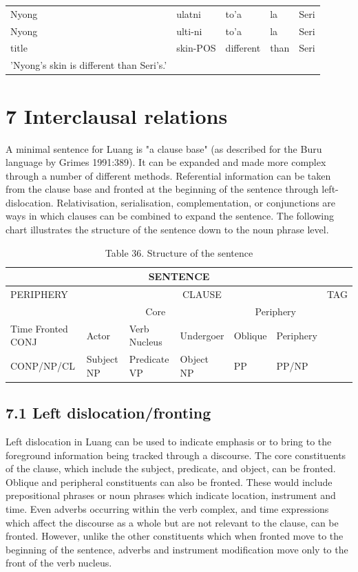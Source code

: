 \documentclass[10pt]{article}
\begin{document}
\begin{center}
\begin{tabular}{lllll}
Nyong & ulatni & to'a & la & Seri \\
Nyong & ulti-ni & to'a & la & Seri \\
title & skin-POS & different & than & Seri \\
'Nyong's skin is different than Seri's.' &  &  &  &  \\
\end{tabular}
\end{center}

\section*{7 Interclausal relations}
A minimal sentence for Luang is "a clause base" (as described for the Buru language by Grimes 1991:389). It can be expanded and made more complex through a number of different methods. Referential information can be taken from the clause base and fronted at the beginning of the sentence through left-dislocation. Relativisation, serialisation, complementation, or conjunctions are ways in which clauses can be combined to expand the sentence. The following chart illustrates the structure of the sentence down to the noun phrase level.

\begin{table}[h]
\begin{center}
\captionsetup{labelformat=empty}
\caption{Table 36. Structure of the sentence}
\begin{tabular}{|l|l|l|l|l|l|l|}
\hline
\multicolumn{7}{|c|}{SENTENCE} \\
\hline
PERIPHERY & \multicolumn{5}{|c|}{CLAUSE} & TAG \\
\hline
 & \multicolumn{3}{|c|}{Core} & \multicolumn{2}{|c|}{Periphery} &  \\
\hline
Time Fronted CONJ & Actor & Verb Nucleus & Undergoer & Oblique & Periphery &  \\
\hline
CONP/NP/CL & Subject NP & Predicate VP & Object NP & PP & PP/NP &  \\
\hline
\end{tabular}
\end{center}
\end{table}

\subsection*{7.1 Left dislocation/fronting}
Left dislocation in Luang can be used to indicate emphasis or to bring to the foreground information being tracked through a discourse. The core constituents of the clause, which include the subject, predicate, and object, can be fronted. Oblique and peripheral constituents can also be fronted. These would include prepositional phrases or noun phrases which indicate location, instrument and time. Even adverbs occurring within the verb complex, and time expressions which affect the discourse as a whole but are not relevant to the clause, can be fronted. However, unlike the other constituents which when fronted move to the beginning of the sentence, adverbs and instrument modification move only to the front of the verb nucleus.
\end{document}
